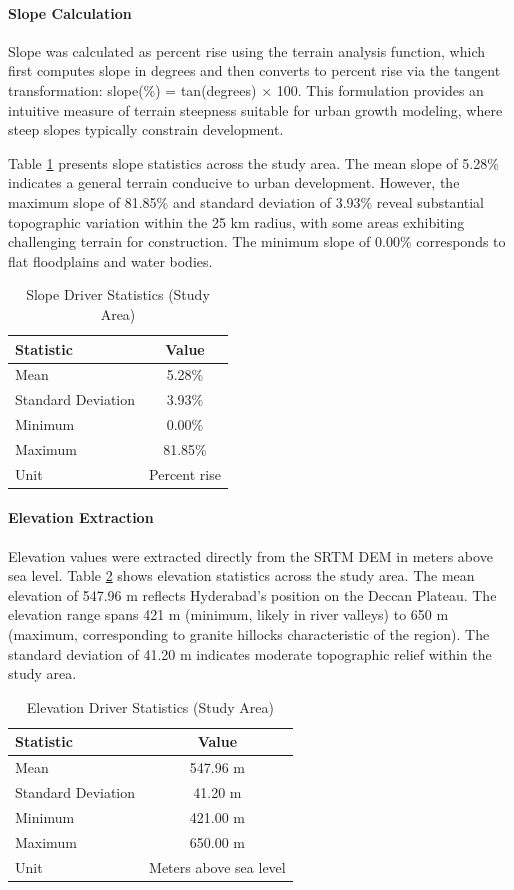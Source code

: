 \documentclass[12pt,a4paper]{article}
\begin{document}
\paragraph{Slope Calculation}
Slope was calculated as percent rise using the terrain analysis function, which first computes slope in degrees and then converts to percent rise via the tangent transformation: slope(\%) = tan(degrees) $\times$ 100. This formulation provides an intuitive measure of terrain steepness suitable for urban growth modeling, where steep slopes typically constrain development.

Table \ref{tab:slope_stats} presents slope statistics across the study area. The mean slope of 5.28\% indicates a general terrain conducive to urban development. However, the maximum slope of 81.85\% and standard deviation of 3.93\% reveal substantial topographic variation within the 25 km radius, with some areas exhibiting challenging terrain for construction. The minimum slope of 0.00\% corresponds to flat floodplains and water bodies.

\begin{table}[H]
\caption{Slope Driver Statistics (Study Area)}
\label{tab:slope_stats}
\centering
\small
\begin{tabular}{lc}
\toprule
\textbf{Statistic} & \textbf{Value} \\
\midrule
Mean & 5.28\% \\
Standard Deviation & 3.93\% \\
Minimum & 0.00\% \\
Maximum & 81.85\% \\
Unit & Percent rise \\
\bottomrule
\end{tabular}
\end{table}

\paragraph{Elevation Extraction}
Elevation values were extracted directly from the SRTM DEM in meters above sea level. Table \ref{tab:elevation_stats} shows elevation statistics across the study area. The mean elevation of 547.96 m reflects Hyderabad's position on the Deccan Plateau. The elevation range spans 421 m (minimum, likely in river valleys) to 650 m (maximum, corresponding to granite hillocks characteristic of the region). The standard deviation of 41.20 m indicates moderate topographic relief within the study area.

\begin{table}[H]
\caption{Elevation Driver Statistics (Study Area)}
\label{tab:elevation_stats}
\centering
\small
\begin{tabular}{lc}
\toprule
\textbf{Statistic} & \textbf{Value} \\
\midrule
Mean & 547.96 m \\
Standard Deviation & 41.20 m \\
Minimum & 421.00 m \\
Maximum & 650.00 m \\
Unit & Meters above sea level \\
\bottomrule
\end{tabular}
\end{table}
\end{document}
